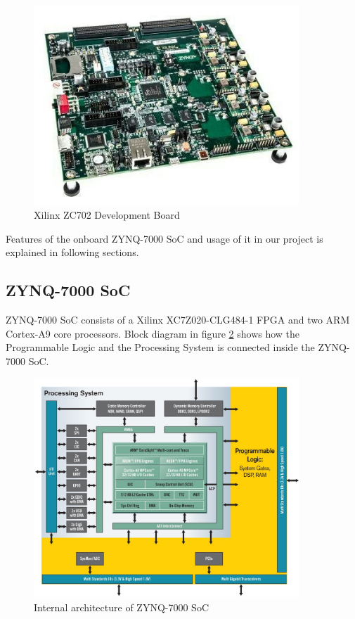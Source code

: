 \documentclass[12pt,a4paper]{report}
\begin{document}
\begin{figure}[H]
\includegraphics[width=10cm]{zc702.jpg}
\centering
\caption{Xilinx ZC702 Development Board}
\label{board}
\end{figure}


Features of the onboard ZYNQ-7000 SoC and usage of it in our project is explained in following sections.

\subsection{ZYNQ-7000 SoC}
ZYNQ-7000 SoC consists of a Xilinx XC7Z020-CLG484-1 FPGA and two ARM Cortex-A9 core processors. Block diagram in figure \ref{zynq} shows how the Programmable Logic and the Processing System is connected inside the ZYNQ-7000 SoC.

\begin{figure}[H]
\includegraphics[width=10cm]{zynq.jpg}
\centering
\caption{Internal architecture of ZYNQ-7000 SoC}
\label{zynq}
\end{figure}
\end{document}
